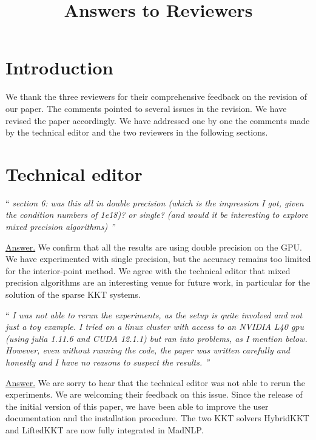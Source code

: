 \documentclass[10pt,a4paper]{article}
\newenvironment{quotereviewer}{\vspace{.5cm}{\underline\reviewername} ``\it\footnotesize}{''}
\newcommand{\answer}{\vspace{1mm}\underline{Answer.} }
\begin{document}
\title{\textbf{Answers to Reviewers}\\
}
\maketitle

\section*{Introduction}
We thank the three reviewers for their comprehensive feedback on the revision of our paper. The comments pointed to several issues in the revision. We have revised the paper accordingly. We have addressed one by one the comments made by the technical editor and the two reviewers in the following sections.

\section{Technical editor}
\def\reviewername{Technical editor}
\bigskip

\begin{quotereviewer}
section 6: was this all in double precision (which is the impression I got, given the condition numbers of 1e18)? or single? (and would it be interesting to explore mixed precision algorithms)
\end{quotereviewer}

\answer
We confirm that all the results are using double precision on the GPU.
We have experimented with single precision, but the accuracy remains too limited for the interior-point method.
We agree with the technical editor that mixed precision algorithms are an interesting venue for future work,
in particular for the solution of the sparse KKT systems.


\begin{quotereviewer}
I was not able to rerun the experiments, as the setup is quite involved and not just a toy example. I tried on a linux cluster with access to an NVIDIA L40 gpu (using julia 1.11.6 and CUDA 12.1.1) but ran into problems, as I mention below. However, even without running the code, the paper was written carefully and honestly and I have no reasons to suspect the results.
\end{quotereviewer}

\answer
We are sorry to hear that the technical editor was not able to rerun the experiments.
We are welcoming their feedback on this issue. Since the release of the initial version of this paper,
we have been able to improve the user documentation and the installation procedure.
The two KKT solvers HybridKKT and LiftedKKT are now fully integrated in MadNLP.
\end{document}
